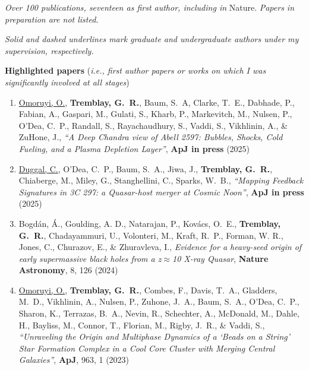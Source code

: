 \documentclass[11pt]{article}
\begin{document}
\textit{Over 100 publications, seventeen as first author, including in} Nature. \textit{Papers in preparation are not listed.}

\textit{Solid and dashed underlines mark graduate and undergraduate authors under my supervision, respectively.}\\

\vspace{-1mm}

\textbf{Highlighted papers} (\textit{i.e., first author papers or works on which I was significantly involved at all stages})\\

\vspace{-4mm}

\begin{enumerate}%


\item \uline{Omoruyi, O.}, \textbf{Tremblay, G.~R.}, Baum, S.~A, Clarke, T.~E., Dabhade, P., Fabian, A., Gaspari, M., Gulati, S., Kharb, P., Markevitch, M., Nulsen, P., O'Dea, C.~P., Randall, S., Rayachaudhury, S., Vaddi, S., Vikhlinin, A., \& ZuHone, J., \textit{``A Deep Chandra view of Abell 2597: Bubbles, Shocks, Cold Fueling, and a Plasma Depletion Layer''}, \textbf{ApJ in press} (2025)

\item \uline{Duggal, C.}, O'Dea, C.~P., Baum, S.~A., Jiwa, J., \textbf{Tremblay, G.~R.}, Chiaberge, M., Miley, G., Stanghellini, C., Sparks, W.~B., \textit{``Mapping Feedback Signatures in 3C 297: a Quasar-host merger at Cosmic Noon''}, \textbf{ApJ in press} (2025)

\item Bogd\'{a}n, \'{A}., Goulding, A. D., Natarajan, P., Kov\'{a}cs, O.~E., \textbf{Tremblay, G.~R.}, Chadayammuri, U., Volonteri, M., Kraft, R.~P., Forman, W. R., Jones, C., Churazov, E., \& Zhuravleva, I., \textit{Evidence for a heavy-seed origin of early supermassive black holes from a z$\approx$10 X-ray Quasar}, \textbf{Nature Astronomy}, 8, 126 (2024)

\item \uline{Omoruyi, O.}, \textbf{Tremblay, G.~R.}, Combes, F., Davis, T.~A., Gladders, M.~D., Vikhlinin, A., Nulsen, P., Zuhone, J.~A., Baum, S.~A., O'Dea, C.~P., Sharon, K., Terrazas, B.~A., Nevin, R., Schechter, A., McDonald, M., Dahle, H., Bayliss, M., Connor, T., Florian, M., Rigby, J.~R., \& Vaddi, S., \textit{``Unraveling the Origin and Multiphase Dynamics of a `Beads on a String' Star Formation Complex in a Cool Core Cluster with Merging Central Galaxies''}, \textbf{ApJ}, 963, 1 (2023)


\end{enumerate}
\end{document}
